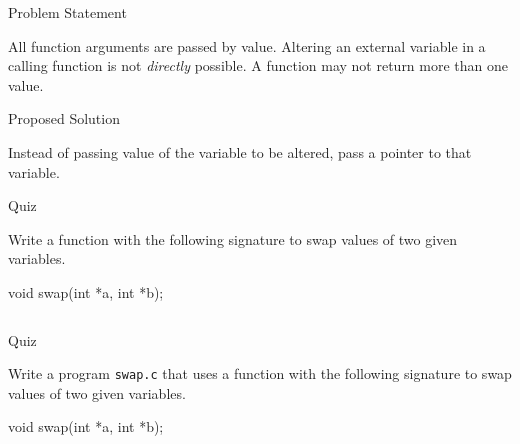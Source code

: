 \documentclass[compress]{beamer}
\begin{document}
\begin{slide}
	\begin{block}{Problem Statement}

	All function arguments are passed by value.
	Altering an external variable in a calling function is not \textit{directly} possible.
	A function may not return more than one value.

	\end{block}
\end{slide}

\begin{slide}
	\begin{block}{Proposed Solution}

	Instead of passing value of the variable to be altered, pass a pointer to that variable.

	\end{block}
\end{slide}

\begin{slide}
	\begin{block}{Quiz}

	Write a function with the following signature to swap values of two given variables.

	\begin{terminal}
	void swap(int *a, int *b);
	\end{terminal}

	\pause

	\inputminted[fontsize=\footnotesize, firstline=12, lastline=17, linenos]{c}{
		\resDirectory/ls10-swap.c
	}

	\end{block}
\end{slide}

\begin{slide}
	\begin{block}{Quiz}

	Write a program \texttt{swap.c} that uses a function with the following signature to swap values of two given variables.

	\begin{terminal}
	void swap(int *a, int *b);
	\end{terminal}

	\pause

	\inputminted[fontsize=\footnotesize, firstline=19, linenos]{c}{
		\resDirectory/ls10-swap.c
	}

	\end{block}
\end{slide}
\end{document}
